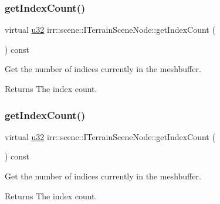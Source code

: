 \subsubsection{\texorpdfstring{get\+Index\+Count()}{getIndexCount()}\hspace{0.1cm}{\footnotesize\ttfamily [1/2]}}
{\footnotesize\ttfamily virtual \hyperlink{namespaceirr_a0416a53257075833e7002efd0a18e804}{u32} irr\+::scene\+::\+I\+Terrain\+Scene\+Node\+::get\+Index\+Count (\begin{DoxyParamCaption}{ }\end{DoxyParamCaption}) const\hspace{0.3cm}{\ttfamily [pure virtual]}}



Get the number of indices currently in the meshbuffer. 

\begin{DoxyReturn}{Returns}
The index count. 
\end{DoxyReturn}
\mbox{\label{classirr_1_1scene_1_1ITerrainSceneNode_a0f09a8260f325570ce58f0fc6993aff9}} 
\subsubsection{\texorpdfstring{get\+Index\+Count()}{getIndexCount()}\hspace{0.1cm}{\footnotesize\ttfamily [2/2]}}
{\footnotesize\ttfamily virtual \hyperlink{namespaceirr_a0416a53257075833e7002efd0a18e804}{u32} irr\+::scene\+::\+I\+Terrain\+Scene\+Node\+::get\+Index\+Count (\begin{DoxyParamCaption}{ }\end{DoxyParamCaption}) const\hspace{0.3cm}{\ttfamily [pure virtual]}}



Get the number of indices currently in the meshbuffer. 

\begin{DoxyReturn}{Returns}
The index count. 
\end{DoxyReturn}
\mbox{\label{classirr_1_1scene_1_1ITerrainSceneNode_aec6d83c4882fad10a0b35ca5a7ec0935}} 
